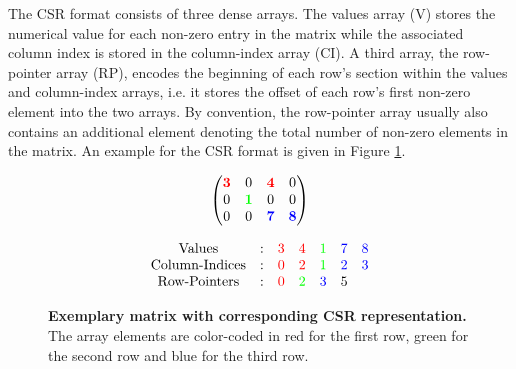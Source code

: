 \documentclass{article}
\begin{document}
    The CSR format consists of three dense arrays. The values array (V) stores the numerical value for each non-zero entry in the matrix while the associated column index is stored in the column-index array (CI). A third array, the row-pointer array (RP), encodes the beginning of each row's section within the values and column-index arrays, i.e. it stores the offset of each row's first non-zero element into the two arrays. By convention, the row-pointer array usually also contains an additional element denoting the total number of non-zero elements in the matrix. An example for the CSR format is given in Figure \ref{fig:csr_example}.

    \begin{figure}[ht]
      \centering
      \begin{minipage}{0.4\textwidth}
        \centering
        $$
        \begin{pmatrix}
          \color{red}{\bm{3}} &                     0 &  \color{red}{\bm{4}} &                    0 \\
                            0 & \color{green}{\bm{1}} &                    0 &                    0 \\
                            0 &                     0 & \color{blue}{\bm{7}} & \color{blue}{\bm{8}} \\
        \end{pmatrix}
        $$
      \end{minipage}
      \begin{minipage}{0.4\textwidth}
        \centering
        $$
        \begin{matrix}
          \text{Values}  & : & \color{red}{3} &   \color{red}{4} & \color{green}{1} & \color{blue}{7} & \color{blue}{8} \\
          \text{Column-Indices} & : & \color{red}{0} &   \color{red}{2} & \color{green}{1} & \color{blue}{2} & \color{blue}{3} \\
          \text{Row-Pointers} & : & \color{red}{0} & \color{green}{2} &  \color{blue}{3} &               5 &                 \\
        \end{matrix}
        $$
      \end{minipage}
      \caption[Exemplary matrix with corresponding CSR representation.]{\textbf{Exemplary matrix with corresponding CSR representation.} The array elements are color-coded in red for the first row, green for the second row and blue for the third row.}
      \label{fig:csr_example}
    \end{figure}
\end{document}
